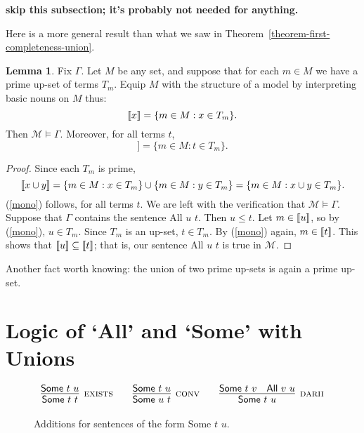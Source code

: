 \documentclass[12pt]{article}
\theoremstyle{definition}
\newtheorem{lemma}[theorem]{Lemma}
\newcommand{\semantics}[1]{[\![\mbox{\em $ #1 $\/}]\!]}
\newcommand{\Model}{\mathcal{M}}
\newcommand{\set}[1]{\{ #1 \}}
\newlength{\mathfrwidth}
\newenvironment{mathframe}
    {\begin{lrbox}{\mathfrbox}\begin{minipage}{\mathfrwidth}\begin{center}}
    {\end{center}\end{minipage}\end{lrbox}\noindent\fbox{\usebox{\mathfrbox}}}
\begin{document}
{\bf skip this subsection; it's probably not needed for anything.}

Here is a more general result than what we saw in Theorem~\ref{theorem-first-completeness-union}.

\begin{lemma} 
Fix $\Gamma$.
Let $M$ be any set, and suppose that for each $m\in M$ we have a prime up-set of terms $T_m$. 
Equip $M$ with the structure of a model by  interpreting 
basic nouns on $M$ thus:
 \[
 \semantics{x} = \set{m\in M : x \in T_m }.
 \]
 Then $\Model\models\Gamma$.   Moreover, for all terms $t$, 
  \begin{equation}
  \semantics{t} = \set{m\in M : t \in T_m }.
  \label{mono}
    \end{equation}
 \end{lemma}
 
 \begin{proof}
Since each $T_m$ is prime, 
 \[
 \semantics{x\cup y} =  \set{m\in M : x \in T_m }\cup\set{m\in M : y \in T_m } = \set{m\in M : x\cup y  \in T_m }.
 \]
 (\ref{mono}) follows, for all terms $t$.
 We are left with the verification that $\Model\models\Gamma$.
 Suppose that $\Gamma$ contains the sentence {\sf All $u$ $t$}.  
 Then $u \leq t$.
 Let $m\in \semantics{u}$, so by (\ref{mono}), $u\in T_m$.
 Since $T_m$ is an up-set, $t\in T_m$.    By (\ref{mono}) again, $m\in \semantics{t}$.  This shows that 
$\semantics{u} \subseteq \semantics{t}$; that is, our sentence  {\sf All $u$ $t$}  is true in $\Model$. 
 \end{proof}
 
 Another fact worth knowing: the union of two prime up-sets is again a prime up-set.


\section{Logic of `All' and `Some' with Unions}

 \begin{figure}[t]
\begin{mathframe}
\[
\begin{array}{l@{\qquad}l@{\qquad}l}
\infer[\mbox{\sc exists}]{\mbox{\sf Some $t$ $t$}}{\mbox{\sf Some $t$ $u$}}
&
\infer[\mbox{\sc conv}]{\mbox{\sf Some $u$ $t$}}{\mbox{\sf Some $t$ $u$}}
&
\infer[\mbox{\sc darii}]{\mbox{\sf Some $t$ $u$}}{\mbox{\sf Some $t$ $v$} & \mbox{\sf All $v$ $u$}}
\end{array}
\]
\caption{Additions for sentences of the form {\sf Some $t$ $u$}.\label{fig-adding-some}}
\end{mathframe}
\end{figure}
\end{document}
